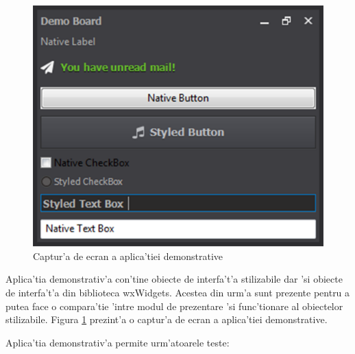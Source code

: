 \begin{figure}[H]
\begin{center}
\includegraphics{img/ch6_demo_app.png}
\end{center}
\caption{Captur'a de ecran a aplica'tiei demonstrative}
\label{fig0602}
\end{figure}

Aplica'tia demonstrativ'a con'tine obiecte de interfa't'a stilizabile dar 'si obiecte de interfa't'a din biblioteca wxWidgets. Acestea din urm'a sunt prezente pentru a putea face o compara'tie 'intre modul de prezentare 'si func'tionare al obiectelor stilizabile. Figura \ref{fig0602} prezint'a o captur'a de ecran a aplica'tiei demonstrative.

\medskip

Aplica'tia demonstrativ'a permite urm'atoarele teste:

